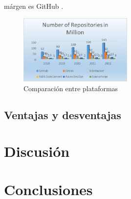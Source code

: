 \documentclass[runningheads]{llncs}
\begin{document}
márgen es GitHub \cite{uddin2023comparative}.
\begin{figure}[htbp]
        \centering
        \includegraphics[width=0.5\textwidth]{Comp-rep.png}
        \caption{Comparación entre plataformas}
        \label{fig:comp-rep}
\end{figure}
\subsection{Ventajas y desventajas}
\section{Discusión}
\section{Conclusiones}


\end{document}
